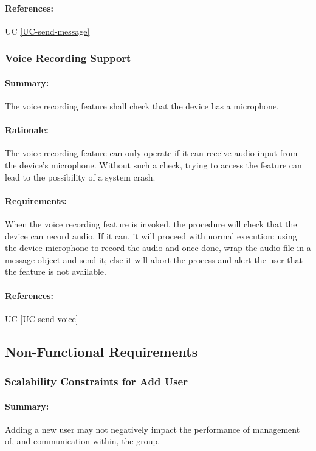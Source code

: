 \documentclass[11pt]{article}
\begin{document}
\paragraph{References:} UC \ref{UC-send-message}
\subsubsection{Voice Recording Support} \label{FR-voice-record-support}
\paragraph{Summary:} The voice recording feature shall check that the device has a microphone.
\paragraph{Rationale:} The voice recording feature can only operate if it can receive audio input from the device's microphone. Without such a check, trying to access the feature can lead to the possibility of a system crash.
\paragraph{Requirements:} When the voice recording feature is invoked, the procedure will check that the device can record audio. If it can, it will proceed with normal execution: using the device microphone to record the audio and once done, wrap the audio file in a message object and send it; else it will abort the process and alert the user that the feature is not available.
\paragraph{References:} UC \ref{UC-send-voice}

\subsection{Non-Functional Requirements}
\subsubsection{Scalability Constraints for Add User} \label{NF-performance-add-member}
\paragraph{Summary:} Adding a new user may not negatively impact the performance of management of, and communication within, the group.
\end{document}

